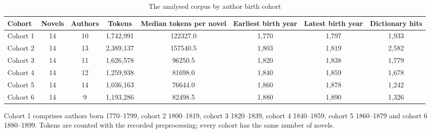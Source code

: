 \begin{table}[t]
\centering
\begin{threeparttable}
\caption{The analysed corpus by author birth cohort}
\label{tab:corpus}
\begin{tabular}{lccccccc}
\toprule
Cohort & Novels & Authors & Tokens & Median tokens per novel & Earliest birth year & Latest birth year & Dictionary hits \\
\midrule
Cohort 1 & 14 & 10 & 1,742,991 & 122327.0 & 1,770 & 1,797 & 1,933 \\
Cohort 2 & 14 & 13 & 2,389,137 & 157540.5 & 1,803 & 1,819 & 2,582 \\
Cohort 3 & 14 & 11 & 1,626,578 & 96250.5 & 1,820 & 1,838 & 1,779 \\
Cohort 4 & 14 & 12 & 1,259,938 & 81698.0 & 1,840 & 1,859 & 1,678 \\
Cohort 5 & 14 & 14 & 1,036,163 & 76644.0 & 1,860 & 1,878 & 1,242 \\
Cohort 6 & 14 & 9 & 1,193,286 & 82498.5 & 1,880 & 1,890 & 1,326 \\
\bottomrule
\end{tabular}
\begin{tablenotes}[flushleft]
\footnotesize
\item Cohort 1 comprises authors born 1770--1799, cohort 2 1800--1819, cohort 3 1820--1839, cohort 4 1840--1859, cohort 5 1860--1879 and cohort 6 1880--1899. Tokens are counted with the recorded preprocessing; every cohort has the same number of novels.
\end{tablenotes}
\end{threeparttable}
\end{table}
